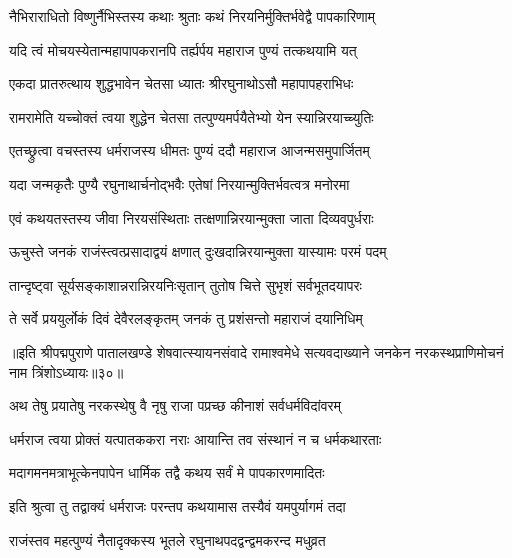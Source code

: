 
\twolineshloka
{नैभिराराधितो विष्णुर्नैभिस्तस्य कथाः श्रुताः}
{कथं निरयनिर्मुक्तिर्भवेद्वै पापकारिणाम्}%

\twolineshloka
{यदि त्वं मोचयस्येतान्महापापकरानपि}
{तर्ह्यर्पय महाराज पुण्यं तत्कथयामि यत्}%

\twolineshloka
{एकदा प्रातरुत्थाय शुद्धभावेन चेतसा}
{ध्यातः श्रीरघुनाथोऽसौ महापापहराभिधः}%

\twolineshloka
{रामरामेति यच्चोक्तं त्वया शुद्धेन चेतसा}
{तत्पुण्यमर्पयैतेभ्यो येन स्यान्निरयाच्च्युतिः}%


\twolineshloka
{एतच्छ्रुत्वा वचस्तस्य धर्मराजस्य धीमतः}
{पुण्यं ददौ महाराज आजन्मसमुपार्जितम्}%

\twolineshloka
{यदा जन्मकृतैः पुण्यै रघुनाथार्चनोद्भवैः}
{एतेषां निरयान्मुक्तिर्भवत्वत्र मनोरमा}%

\twolineshloka
{एवं कथयतस्तस्य जीवा निरयसंस्थिताः}
{तत्क्षणान्निरयान्मुक्ता जाता दिव्यवपुर्धराः}%

\twolineshloka
{ऊचुस्ते जनकं राजंस्त्वत्प्रसादाद्वयं क्षणात्}
{दुःखदान्निरयान्मुक्ता यास्यामः परमं पदम्}%

\twolineshloka
{तान्दृष्ट्वा सूर्यसङ्काशान्नरान्निरयनिःसृतान्}
{तुतोष चित्ते सुभृशं सर्वभूतदयापरः}%

\twolineshloka
{ते सर्वे प्रययुर्लोकं दिवं देवैरलङ्कृतम्}
{जनकं तु प्रशंसन्तो महाराजं दयानिधिम्}%

{॥इति श्रीपद्मपुराणे पातालखण्डे शेषवात्स्यायनसंवादे रामाश्वमेधे सत्यवदाख्याने जनकेन नरकस्थप्राणिमोचनं नाम त्रिंशोऽध्यायः॥३०॥}

\resetShloka


\twolineshloka
{अथ तेषु प्रयातेषु नरकस्थेषु वै नृषु}
{राजा पप्रच्छ कीनाशं सर्वधर्मविदांवरम्}%


\twolineshloka
{धर्मराज त्वया प्रोक्तं यत्पातककरा नराः}
{आयान्ति तव संस्थानं न च धर्मकथारताः}%

\twolineshloka
{मदागमनमत्राभूत्केनपापेन धार्मिक}
{तद्वै कथय सर्वं मे पापकारणमादितः}%

\twolineshloka
{इति श्रुत्वा तु तद्वाक्यं धर्मराजः परन्तप}
{कथयामास तस्यैवं यमपुर्यागमं तदा}%


\twolineshloka
{राजंस्तव महत्पुण्यं नैतादृक्कस्य भूतले}
{रघुनाथपदद्वन्द्वमकरन्द मधुव्रत}%

